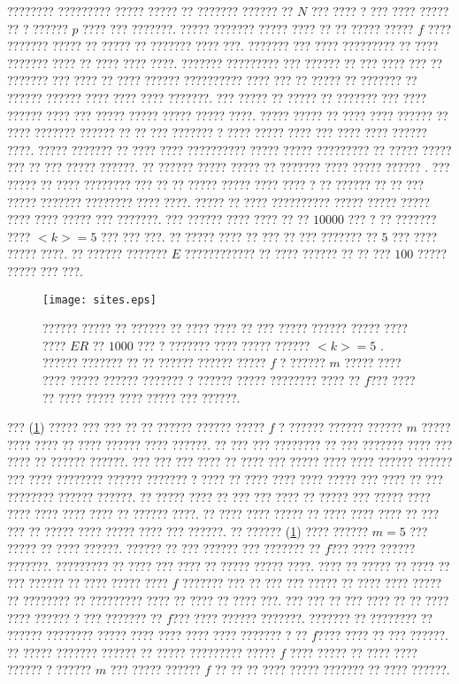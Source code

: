 ???????? ????????? ????? ????? ?? ??????? ?????? ?? $N$ ??? ???? ? ??? ???? ????? ?? ? ?????? $p$ ???? ??? ???????. ????? ??????? ????? ???? ?? ?? ????? ????? $f$ ???? ??????? ????? ?? ????? ?? ??????? ???? ???. ??????? ??? ???? ????????? ?? ???? ??????? ???? ?? ???? ???? ????. ??????? ????????? ??? ?????? ?? ??? ???? ??? ?? ??????? ??? ???? ?? ???? ?????? ?????????? ???? ??? ?? ????? ?? ??????? ?? ?????? ?????? ???? ???? ???? ???????. ??? ????? ?? ????? ?? ??????? ??? ???? ?????? ???? ??? ????? ????? ????? ????? ????. ????? ????? ?? ???? ???? ?????? ?? ???? ??????? ?????? ?? ?? ??? ???????  ? ???? ????? ???? ??? ???? ???? ?????? ????. ????? ??????? ?? ???? ???? ?????????? ????? ?????  ?????????  ?? ????? ????? ??? ?? ??? ????? ??????. ?? ?????? ????? ????? ?? ??????? ???? ????? ?????? . ??? ?????  ?? ???? ???????? ??? ?? ?? ????? ????? ???? ???? ? ?? ?????? ?? ?? ??? ????? ??????? ???????? ???? ????. ?????  ?? ???? ?????????? ?????  ????? ????? ???? ???? ????? ??? ???????. ??? ?????? ???? ???? ?? ?? $10000$ ??? ? ?? ??????? ???? $<k> = 5$ ??? ???  ???.  ?? ????? ???? ?? ??? ?? ??? ??????? ?? $5$ ??? ???? ????? ????. ?? ?????? ??????? $E$ ????????????  ?? ???? ?????? ?? ?? ???  $100$ ????? ????? ??? ???.

\begin{figure} [htbp]
\centering
\texttt{[image: sites.eps]} 
\caption [?????? ????? ?? ?????? ?? ???? ???? ??  ???  ????? ?????? ????? ???? ???? $ER$]{\footnotesize ?????? ????? ?? ?????? ?? ???? ???? ??  ???  ????? ?????? ????? ???? ???? $ER$ ?? $1000$ ??? ?  ??????? ???? ????? ?????? $<k> = 5$  . ?????? ??????? ?? ?? ?????? ?????? ????? $f$  ? ?????? $m$ ????? ???? ???? ????? ?????? ??????? ? ?????? ????? ???????? ????  ?? $f$??? ???? ?? ???? ????? ???? ????? ??? ??????.}
\label{fig:sites}
\end{figure}
??? (\ref{fig:sites}) ????? ??? ??? ?? ?? ?????? ?????? ?????  $f$ ? ?????? ?????? ??????  $m$ ????? ???? ???? ?? ???? ?????? ???? ??????. ?? ??? ??? ???????? ?? ??? ??????? ???? ??? ???? ?? ?????? ??????. ??? ??? ??? ???? ?? ???? ??? ????? ???? ????  ?????? ?????? ??? ???? ???????? ?????? ??????? ? ???? ?? ???? ???? ???? ????? ??? ???? ?? ??? ???????? ?????? ??????. ?? ????? ???? ?? ??? ??? ???? ?? ????? ??? ????? ???? ???? ???? ???? ???? ?? ?????? ????. ?? ???? ???? ????? ?? ???? ????  ???? ?? ??? ??? ?? ????? ???? ????? ???? ??? ??????. ?? ?????? (\ref{fig:sites})  ????  ?????? $m = 5$ ??? ????? ?? ???? ??????. ?????? ?? ??? ?????? ??? ??????? ?? $f$??? ???? ?????? ???????. ????????? ?? ???? ??? ???? ?? ????? ????? ????. ???? ?? ????? ?? ???? ?? ??? ??????  ?? ???? ????? ???? $f$ ??????? ??? ?? ??? ??? ????? ?? ???? ???? ????? ?? ???????? ?? ????????? ???? ?? ???? ?? ???? ???. ??? ??? ?? ???  ???? ?? ?? ???? ???? ?????? ? ??? ??????? ?? $f$??? ???? ?????? ???????. ??????? ?? ???????? ?? ?????? ???????? ????? ???? ???? ???? ???? ??????? ? ?? $f$???? ???? ?? ??? ??????. ?? ????? ??????? ?????? ?? ????? ????????? ?????  $f$ ???? ????? ?? ???? ???? ?????? ? ?????? $m$ ??? ????? ?????? $f$ ?? ?? ?? ???? ????? ??????? ?? ???? ??????.





